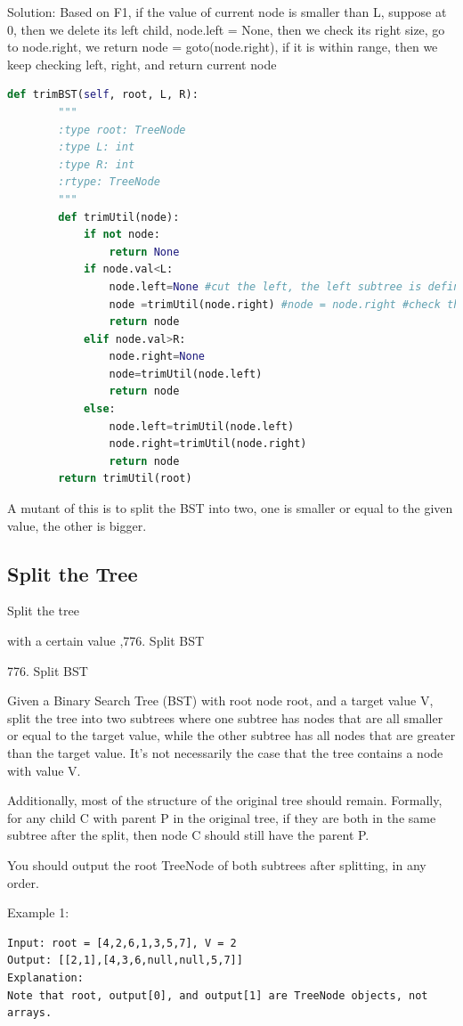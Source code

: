 \documentclass[../main.tex]{subfiles}
\begin{document}
Solution: Based on F1, if the value of current node is smaller than L, suppose at 0, then we delete its left child, node.left = None, then we check its right size, go to node.right, we return node = goto(node.right), if it is within range, then we keep checking left, right, and return current node
\begin{lstlisting}[language = Python]
def trimBST(self, root, L, R):
        """
        :type root: TreeNode
        :type L: int
        :type R: int
        :rtype: TreeNode
        """
        def trimUtil(node):
            if not node:
                return None
            if node.val<L:
                node.left=None #cut the left, the left subtree is definitly smaller than L              
                node =trimUtil(node.right) #node = node.right #check the right
                return node
            elif node.val>R:
                node.right=None
                node=trimUtil(node.left)
                return node
            else:
                node.left=trimUtil(node.left)
                node.right=trimUtil(node.right)
                return node       
        return trimUtil(root)
\end{lstlisting}
A mutant of this is to split the BST into two, one is smaller or equal to the given value, the other is bigger.
\subsection{Split the Tree}
Split the tree

with a certain value ,776. Split BST

776. Split BST

Given a Binary Search Tree (BST) with root node root, and a target value V, split the tree into two subtrees where one subtree has nodes that are all smaller or equal to the target value, while the other subtree has all nodes that are greater than the target value. It's not necessarily the case that the tree contains a node with value V.

Additionally, most of the structure of the original tree should remain. Formally, for any child C with parent P in the original tree, if they are both in the same subtree after the split, then node C should still have the parent P.

You should output the root TreeNode of both subtrees after splitting, in any order.

Example 1:
\begin{lstlisting}
Input: root = [4,2,6,1,3,5,7], V = 2
Output: [[2,1],[4,3,6,null,null,5,7]]
Explanation:
Note that root, output[0], and output[1] are TreeNode objects, not arrays.
\end{lstlisting}
\end{document}
